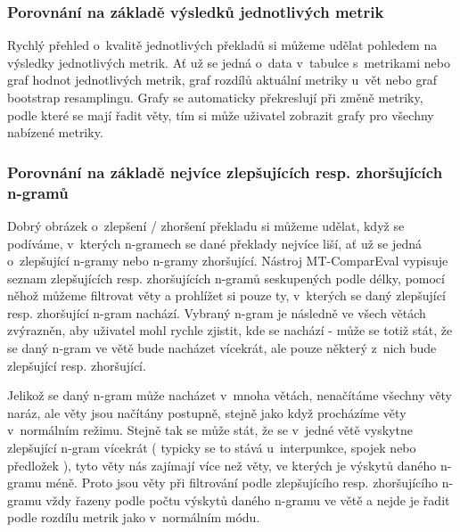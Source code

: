 \subsubsection{Porovnání na základě výsledků jednotlivých metrik}
Rychlý přehled o~kvalitě jednotlivých překladů si můžeme udělat pohledem na výsledky jednotlivých metrik.
Ať už se jedná o~data v~tabulce s~metrikami nebo graf hodnot jednotlivých metrik,
  graf rozdílů aktuální metriky u~vět nebo graf bootstrap resamplingu.
Grafy se automaticky překreslují při změně metriky,
  podle které se mají řadit věty,
  tím si může uživatel zobrazit grafy pro všechny nabízené metriky.


\subsubsection{Porovnání na základě nejvíce zlepšujících resp. zhoršujících n-gramů}
Dobrý obrázek o~zlepšení / zhoršení překladu si můžeme udělat,
  když se podíváme,
  v~kterých n-gramech se dané překlady nejvíce liší,
  ať už se jedná o~zlepšující n-gramy nebo n-gramy zhoršující.
Nástroj \mbox{MT-ComparEval} vypisuje seznam zlepšujících resp. zhoršujících n-gramů seskupených podle délky,
  pomocí něhož můžeme filtrovat věty a prohlížet si pouze ty,
  v~kterých se daný zlepšující resp. zhoršující n-gram nachází.
Vybraný n-gram je následně ve všech větách zvýrazněn,
  aby uživatel mohl rychle zjistit, kde se nachází -
  může se totiž stát, že se daný n-gram ve větě bude nacházet vícekrát,
  ale pouze některý z~nich bude zlepšující resp. zhoršující.

Jelikož se daný n-gram může nacházet v~mnoha větách,
  nenačítáme všechny věty naráz,
  ale věty jsou načítány postupně,
  stejně jako když procházíme věty v~normálním režimu.
Stejně tak se může stát,
  že se v~jedné větě vyskytne zlepšující n-gram vícekrát
  ( typicky se to stává u~interpunkce, spojek nebo předložek ),
  tyto věty nás zajímají více než věty,
  ve kterých je výskytů daného n-gramu méně.
Proto jsou věty při filtrování podle zlepšujícího resp. zhoršujícího n-gramu vždy řazeny podle počtu výskytů daného n-gramu ve větě
  a nejde je řadit podle rozdílu metrik jako v~normálním módu.


